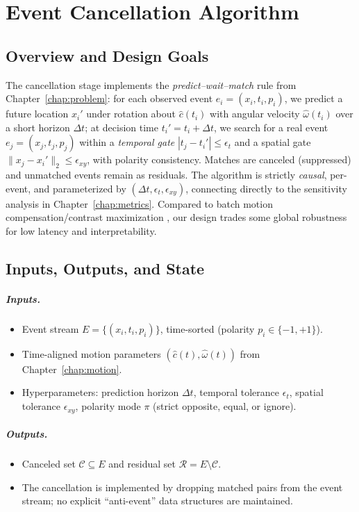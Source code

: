 \chapter{Event Cancellation Algorithm}
\label{chap:cancellation}

\section{Overview and Design Goals}
The cancellation stage implements the \emph{predict–wait–match} rule from Chapter~\ref{chap:problem}: for each observed event $e_i=(x_i,t_i,p_i)$, we predict a future location $x_i'$ under rotation about $\hat c(t_i)$ with angular velocity $\hat\omega(t_i)$ over a short horizon $\Delta t$; at decision time $t_i' = t_i+\Delta t$, we search for a real event $e_j=(x_j,t_j,p_j)$ within a \emph{temporal gate} $|t_j-t_i'| \le \epsilon_t$ and a spatial gate $\|x_j-x_i'\|_2 \le \epsilon_{xy}$, with polarity consistency. Matches are canceled (suppressed) and unmatched events remain as residuals. The algorithm is strictly \emph{causal}, per-event, and parameterized by $(\Delta t,\epsilon_t,\epsilon_{xy})$, connecting directly to the sensitivity analysis in Chapter~\ref{chap:metrics}. Compared to batch motion compensation/contrast maximization \cite{Gallego2018CMax,Stoffregen2019Segmentation,Bardow2016SOFIE}, our design trades some global robustness for low latency and interpretability.

\section{Inputs, Outputs, and State}
\paragraph{Inputs.}
\begin{itemize}
    \item Event stream $E=\{(x_i,t_i,p_i)\}$, time-sorted (polarity $p_i\in\{-1,+1\}$).
    \item Time-aligned motion parameters $(\hat c(t),\hat\omega(t))$ from Chapter~\ref{chap:motion}.
    \item Hyperparameters: prediction horizon $\Delta t$, temporal tolerance $\epsilon_t$, spatial tolerance $\epsilon_{xy}$, polarity mode $\pi$ (strict opposite, equal, or ignore).
\end{itemize}

\paragraph{Outputs.}
\begin{itemize}
    \item Canceled set $\mathcal{C}\subseteq E$ and residual set $\mathcal{R}=E\setminus \mathcal{C}$.
    \item The cancellation is implemented by dropping matched pairs from the event stream; no explicit ``anti-event'' data structures are maintained.
\end{itemize}


